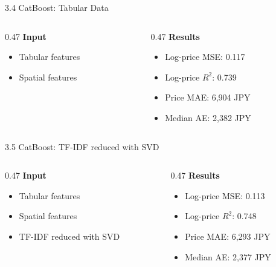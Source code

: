 \documentclass[aspectratio=169,11pt]{beamer}
\begin{document}
\begin{frame}{3.4 CatBoost: Tabular Data}
  \begin{columns}[T,onlytextwidth]
    \begin{column}{0.47\textwidth}
      \textbf{Input}
      \begin{itemize}
        \item Tabular features
        \item Spatial features
      \end{itemize}
    \end{column}
    \begin{column}{0.47\textwidth}
      \textbf{Results}
      \begin{itemize}
        \item Log-price MSE: 0.117
        \item Log-price $R^2$: 0.739
        \item Price MAE: 6,904 JPY
        \item Median AE: 2,382 JPY
      \end{itemize}
    \end{column}
  \end{columns}
\end{frame}

\begin{frame}{3.5 CatBoost: TF-IDF reduced with SVD}
  \begin{columns}[T,onlytextwidth]
    \begin{column}{0.47\textwidth}
      \textbf{Input}
      \begin{itemize}
        \item Tabular features
        \item Spatial features
        \item TF-IDF reduced with SVD
      \end{itemize}
    \end{column}
    \begin{column}{0.47\textwidth}
      \textbf{Results}
      \begin{itemize}
        \item Log-price MSE: 0.113
        \item Log-price $R^2$: 0.748
        \item Price MAE: 6,293 JPY
        \item Median AE: 2,377 JPY
      \end{itemize}
    \end{column}
  \end{columns}
\end{frame}
\end{document}
